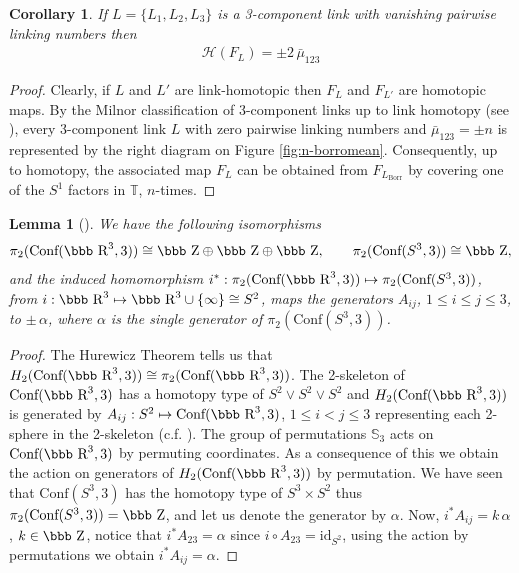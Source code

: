 \documentclass[12pt]{article}
\newtheorem{corollary}[theorem]{Corollary}
\newtheorem{lemma}[theorem]{Lemma}
\newcommand{\R}{\mbox{\bbb R}}       %
\newcommand{\Z}{\mbox{\bbb Z}}
\newcommand{\Cnf}{\text{Conf}}
\begin{document}
\begin{corollary}\label{th:general-mu_123}
 If $L=\{L_1,L_2,L_3\}$ is a 3-component link with vanishing pairwise linking numbers then
 \begin{gather*}
  \mathscr{H}(F_L)=\pm 2\,\bar{\mu}_{123}
 \end{gather*}
\end{corollary}
\begin{proof}
 Clearly, if $L$ and $L'$ are link-homotopic then $F_{L}$ and $F_{L'}$ are homotopic maps.
 By the Milnor classification of 3-component links up to link homotopy (see \cite{Milnor54}), every 3-component link $L$ with zero pairwise linking numbers and $\bar{\mu}_{123}=\pm n$ is represented by the right diagram on Figure \ref{fig:n-borromean}. Consequently, up to homotopy, the associated map $F_L$ can be obtained from $F_{L_\text{Borr}}$ by covering one of the $S^1$ factors in $\mathbb{T}$, $n$-times. 
\end{proof}
\begin{lemma}[\cite{Cohen-private}]
 We have the following isomorphisms
\begin{gather*}
\pi_2 (\Cnf(\R^3,3))\cong \Z\oplus \Z\oplus \Z,\qquad \pi_2
(\Cnf(S^3,3))\cong \Z,
\end{gather*}
and the induced homomorphism $i^\ast:\pi_2 (\Cnf(\R^3,3))\mapsto
\pi_2(\Cnf(S^3,3))$, from $i:\R^3\mapsto \R^3\cup \{\infty\}\cong S^2$, maps the generators $A_{ij}$, $1\leq i\leq
j\leq 3$, to $\pm\,\alpha$, where $\alpha$ is the single generator
of $\pi_2(\Cnf(S^3,3))$.
\end{lemma}
\begin{proof}
The Hurewicz Theorem tells us that $H_2(\Cnf(\R^3,3))\cong
\pi_2(\Cnf(\R^3,3))$. The 2-skeleton of $\Cnf(\R^3,3)$ has a homotopy
type of $S^2\vee S^2\vee S^2$ and $H_2(\Cnf(\R^3,3))$ is generated by 
$A_{ij}: S^2\mapsto \Cnf(\R^3,3)$, $1\leq i<j\leq 3$ representing each 2-sphere in the 2-skeleton (c.f. \cite{Cohen02}).
The group of permutations $\mathbb{S}_3$ acts on $\Cnf(\R^3,3)$ by permuting coordinates.
As a consequence of this we obtain the action on generators of $H_2(\Cnf(\R^3,3))$ by permutation.
We have seen that $\Cnf(S^3,3)$ has the homotopy type of $S^3\times S^2$ thus $\pi_2(\Cnf(S^3,3))=\Z$, and let us  denote the generator by $\alpha$. 
Now, $i^\ast{A_{ij}}=k\,\alpha$, $k\in \Z$, notice that $i^\ast{A_{23}}=\alpha$ since 
 $i\circ A_{23}=\text{id}_{S^2}$, using the action by permutations we obtain 
 $ i^\ast{A_{ij}}=\alpha $.
\end{proof}
\end{document}
